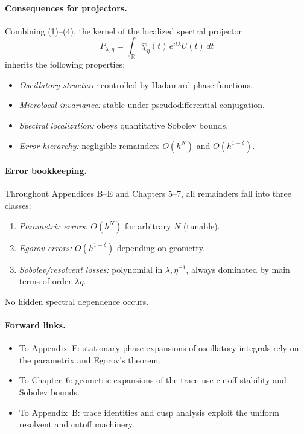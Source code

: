 \paragraph{Consequences for projectors.}
Combining (1)–(4), the kernel of the localized spectral projector
\[
P_{\lambda,\eta} = \int_{\mathbb R}\widehat\chi_\eta(t)\,e^{it\lambda}U(t)\,dt
\]
inherits the following properties:
\begin{itemize}
  \item \emph{Oscillatory structure:} controlled by Hadamard phase functions.
  \item \emph{Microlocal invariance:} stable under pseudodifferential conjugation.
  \item \emph{Spectral localization:} obeys quantitative Sobolev bounds.
  \item \emph{Error hierarchy:} negligible remainders $O(h^N)$ and $O(h^{1-\delta})$.
\end{itemize}

\paragraph{Error bookkeeping.}
Throughout Appendices B–E and Chapters 5–7, all remainders fall into three classes:
\begin{enumerate}
  \item \emph{Parametrix errors:} $O(h^N)$ for arbitrary $N$ (tunable).
  \item \emph{Egorov errors:} $O(h^{1-\delta})$ depending on geometry.
  \item \emph{Sobolev/resolvent losses:} polynomial in $\lambda,\eta^{-1}$,
  always dominated by main terms of order $\lambda\eta$.
\end{enumerate}
No hidden spectral dependence occurs.

\paragraph{Forward links.}
\begin{itemize}
  \item To Appendix~E: stationary phase expansions of oscillatory integrals
  rely on the parametrix and Egorov’s theorem.
  \item To Chapter~6: geometric expansions of the trace use cutoff stability
  and Sobolev bounds.
  \item To Appendix~B: trace identities and cusp analysis exploit the uniform
  resolvent and cutoff machinery.
\end{itemize}

